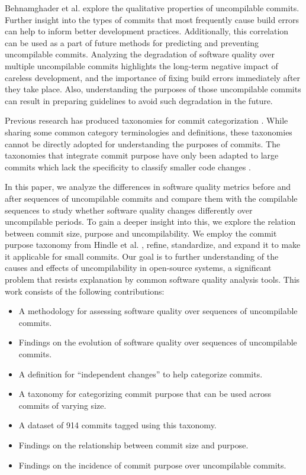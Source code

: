 Behnamghader et al.\cite{pooyan_qrs} explore the qualitative properties of uncompilable commits.
Further insight into the types of commits that most frequently cause build errors can help to inform better development practices. Additionally, this correlation can be used as a part of future methods for predicting and preventing uncompilable commits. 
Analyzing the degradation of software quality over multiple uncompilable commits highlights the long-term negative impact of careless development, and the importance of fixing build errors immediately after they take place.
Also, understanding the purposes of those uncompilable commits can result in preparing guidelines to avoid such degradation in the future.

Previous research has produced taxonomies for commit categorization \cite{Hindle_cate,Alali,Dragan,Swanson, Mauczka, Hindle_auto}. While sharing some common category terminologies and definitions, these taxonomies cannot be directly adopted for understanding the purposes of commits.
The taxonomies that integrate commit purpose have only been adapted to large commits \cite{Hindle_cate,Hindle_auto} which lack the specificity to classify smaller code changes \cite{Swanson}.

In this paper, we analyze the differences in software quality metrics before and after sequences of uncompilable commits and compare them with the compilable sequences to study whether software quality changes differently over uncompilable periods. To gain a deeper insight into this, we explore the relation between commit size, purpose and uncompilability.
We employ the commit purpose taxonomy from Hindle et al. \cite{Hindle_cate}, refine, standardize, and expand it to make it applicable for small commits. 
Our goal is to further understanding of the causes and effects of uncompilability in open-source systems, a significant problem that resists explanation by common software quality analysis tools. This work consists of the following contributions: 
\begin{itemize}
    \item A methodology for assessing software quality over sequences of uncompilable commits.
    \item Findings on the evolution of software quality over sequences of uncompilable commits.
    \item A definition for ``independent changes'' to help categorize commits.
    \item A taxonomy for categorizing commit purpose that can be used across commits of varying size.
    \item A dataset of 914 commits tagged using this taxonomy.
    \item Findings on the relationship between commit size and purpose.
    \item Findings on the incidence of commit purpose over uncompilable commits.  
\end{itemize}

